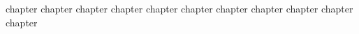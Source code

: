 

{chapter}
{chapter}
{chapter}
{chapter}
{chapter}
{chapter}
{chapter}
{chapter}
{chapter}
{chapter}
{chapter}

\partended
